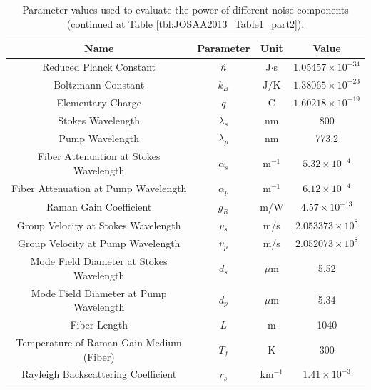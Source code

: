 \begin{table}[t]
\begin{centering}
\begin{tabular}{|c|c|c|c|} \hline
Name & Parameter & Unit & Value\\ \hline\hline
Reduced Planck Constant & $\hbar$ & J$\cdot$s & $1.05457 \times 10^{-34}$ \\ \hline
Boltzmann Constant & $k_B$ & J/K & $1.38065 \times 10^{-23}$  \\ \hline
Elementary Charge & $q$ & C & $1.60218 \times 10^{-19}$  \\ \hline 
Stokes Wavelength & $\lambda_s$ & nm & 800 \\ \hline
Pump Wavelength & $\lambda_p$ & nm & 773.2 \\ \hline
Fiber Attenuation at Stokes Wavelength & $\alpha_s$ & m$^{-1}$ & $5.32 \times 10^{-4}$ \\ \hline
Fiber Attenuation at Pump Wavelength & $\alpha_p$ & m$^{-1}$ & $6.12 \times 10^{-4}$ \\ \hline
Raman Gain Coefficient & $g_R$ & m/W & $4.57 \times 10^{-13}$ \\ \hline
Group Velocity at Stokes Wavelength & $v_s$ & m/s & $2.053373 \times 10^8$ \\ \hline
Group Velocity at Pump Wavelength & $v_p$ & m/s & $2.052073 \times 10^8$ \\ \hline
Mode Field Diameter at Stokes Wavelength & $d_s$ & $\mu$m & 5.52 \\ \hline
Mode Field Diameter at Pump Wavelength & $d_p$ & $\mu$m & 5.34 \\ \hline
Fiber Length & $L$ & m & 1040 \\ \hline
Temperature of Raman Gain Medium (Fiber)& $T_f$ & K & 300 \\ \hline
Rayleigh Backscattering Coefficient & $r_s$ & km$^{-1}$ & $1.41 \times 10^{-3}$ \\ \hline
\end{tabular}
\caption{Parameter values used to evaluate the power of different noise components (continued at Table \ref{tbl:JOSAA2013_Table1_part2}).}
\label{tbl:JOSAA2013_Table1_part1}
\end{centering}
\end{table}

